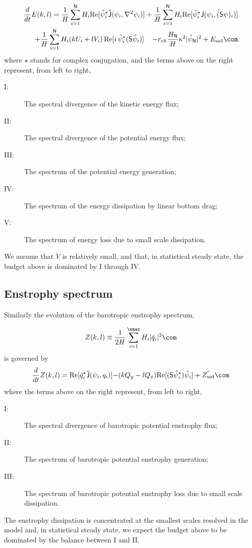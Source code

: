 \documentclass[11pt]{article}
\newcommand{\ssd}{\text{ssd}}
\newcommand{\sS}{\mathsf{S}}
\begin{document}
\begin{align}
    \frac{d}{dt} E(k,l) = {\frac{1}{H}\sum_{i=1}^{\mathsf{N}} H_i \text{Re}[\hat{\psi}_i^\star {\mathsf{\hat{J}}}(\psi_i,\nabla^2\psi_i)]} +
    {\frac{1}{H}\sum_{i=1}^{\mathsf{N}} H_i\text{Re}[\hat{\psi}_i^\star \hat{\mathsf{J} (\psi_i,(\sS \psi)_i)}]} \nonumber \\
    + {\frac{1}{H}\sum_{i=1}^{\mathsf{N}} H_i ( k U_i +  l V_i)\, \text{Re}[i \, \hat{\psi}^\star_i (\mathsf{S}\hat{\psi}_i)]} \,\,\,\,\,\,\,{- r_{ek} \frac{H_\mathsf{N}}{H} \kappa^2 |\hat{\psi}_{\mathsf{N}}|^2}  +{ {{E_\ssd}}} \com
\end{align}
where $\star$ stands for complex conjugation, and the terms above on the right represent, from
left to right,

\begin{description}
    \item[I:]  The spectral divergence of the kinetic energy flux;
    \item[II:] The spectral divergence of the potential energy flux; 
    \item[III:] The spectrum of the potential energy generation;
    \item[IV:] The spectrum of the energy dissipation by linear bottom drag;
    \item[V:] The spectrum of energy loss due to small scale dissipation.
\end{description}
We assume that $V$ is relatively small, and that, in statistical steady state, the
budget above is dominated by I through IV.

\subsection*{Enstrophy spectrum}
Similarly the evolution of the barotropic enstrophy spectrum,

\begin{equation}
Z(k,l) \equiv \frac{1}{2H} \sum_{i=1}^{\nmax} H_i |\hat{q}_i|^2\com
\end{equation}
is governed by
\begin{equation}
    \frac{d}{d t} Z(k,l) = {\text{Re}[\hat{q}_i^\star {\mathsf{\hat{J}}(\psi_i,q_i) ]}}
    {-(k Q_y - l Q_x)\text{Re}[(\sS \hat{\psi}_i^\star)\hat{\psi}_i]}
    + { {\hat{Z_\ssd}}}\com
\end{equation}
where the terms above on the right represent, from
left to right,
\begin{description}
    \item[I:]   The spectral divergence of barotropic potential enstrophy flux;
    \item[II:]  The spectrum of  barotropic potential enstrophy generation;
    \item[III:] The spectrum of  barotropic potential enstrophy loss due to small scale dissipation.
\end{description}
The enstrophy dissipation is concentrated at the smallest scales resolved in the model and, in statistical steady
state, we expect the budget above to be dominated by the balance between I and II.
\end{document}
